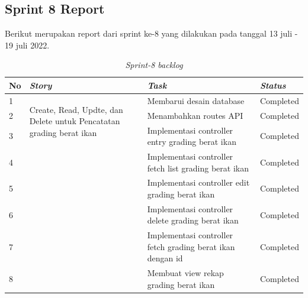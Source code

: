 
\subsection{Sprint 8 Report}
Berikut merupakan report dari sprint ke-8 yang dilakukan pada tanggal 13 juli - 19 juli 2022.

\begin{table}[H]
	\caption{\textit{Sprint-8 backlog}}
	\label{sprint8_backlog}
	\begin{tabular}{@{} |p{0.5cm}|p{5cm}|p{5cm}|p{2cm}| @{}}
		\hline
		\textbf{No} & \textbf{\textit{Story}} & \textbf{\textit{Task}} & \textbf{\textit{Status}} \\
		\hline
		1 & \multirow{3}{5cm}{Create, Read, Updte, dan Delete untuk Pencatatan grading berat ikan} & Membarui desain database  & Completed\\
		\cline{1-1}\cline{3-4}
		2 & & Menambahkan routes API & Completed\\
		\cline{1-1}\cline{3-4}
		3 & & Implementasi controller entry grading berat ikan & Completed\\
		\cline{1-1}\cline{3-4}
		4 & & Implementasi controller fetch list grading berat ikan & Completed\\
		\cline{1-1}\cline{3-4}
		5 & & Implementasi controller edit grading berat ikan & Completed\\
		\cline{1-1}\cline{3-4}
		6 & & Implementasi controller delete grading berat ikan & Completed\\
		\cline{1-1}\cline{3-4}
		7 & & Implementasi controller fetch grading berat ikan dengan id& Completed\\
		\cline{1-1}\cline{3-4}
		8 & & Membuat view rekap grading berat ikan & Completed\\
		\cline{1-1}\cline{3-4}
		\hline
	\end{tabular}
\end{table}

